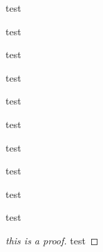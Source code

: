     \begin{definition}
        test    
    \end{definition}
    \begin{proposition}
        test 
    \end{proposition}
    \begin{theorem}
        test 
    \end{theorem}
    \begin{lemma}
        test
    \end{lemma}
    \begin{corollary}
        test 
    \end{corollary}
    \begin{question}
        test
    \end{question}
    \begin{conjecture}
        test
    \end{conjecture}

    \begin{example}
        test 
    \end{example}
    \begin{exercise}
        test
    \end{exercise}
    \begin{remark}
        test
    \end{remark}
    \begin{proof}[this is a proof]
        test
    \end{proof}


